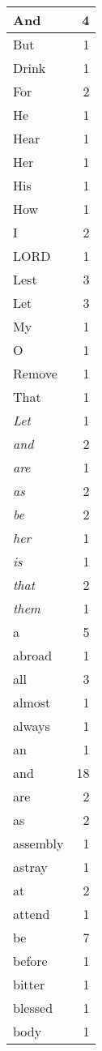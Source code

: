 \begin{center}
\begin{longtable}{l|r}
And & 4\\ \hline 
But & 1\\ \hline 
Drink & 1\\ \hline 
For & 2\\ \hline 
He & 1\\ \hline 
Hear & 1\\ \hline 
Her & 1\\ \hline 
His & 1\\ \hline 
How & 1\\ \hline 
I & 2\\ \hline 
LORD & 1\\ \hline 
Lest & 3\\ \hline 
Let & 3\\ \hline 
My & 1\\ \hline 
O & 1\\ \hline 
Remove & 1\\ \hline 
That & 1\\ \hline 
\emph{Let} & 1\\ \hline 
\emph{and} & 2\\ \hline 
\emph{are} & 1\\ \hline 
\emph{as} & 2\\ \hline 
\emph{be} & 2\\ \hline 
\emph{her} & 1\\ \hline 
\emph{is} & 1\\ \hline 
\emph{that} & 2\\ \hline 
\emph{them} & 1\\ \hline 
a & 5\\ \hline 
abroad & 1\\ \hline 
all & 3\\ \hline 
almost & 1\\ \hline 
always & 1\\ \hline 
an & 1\\ \hline 
and & 18\\ \hline 
are & 2\\ \hline 
as & 2\\ \hline 
assembly & 1\\ \hline 
astray & 1\\ \hline 
at & 2\\ \hline 
attend & 1\\ \hline 
be & 7\\ \hline 
before & 1\\ \hline 
bitter & 1\\ \hline 
blessed & 1\\ \hline 
body & 1\\ \hline 

\end{longtable}
\end{center}
